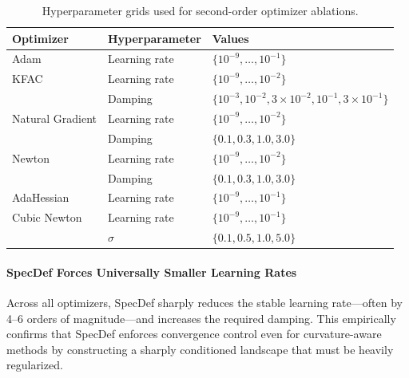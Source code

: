 \documentclass{article}
\theoremstyle{plain}
\theoremstyle{definition}
\theoremstyle{remark}
\begin{document}
\begin{table}[h]
\centering
\caption{Hyperparameter grids used for second-order optimizer ablations.}
\label{tab:second_order_optimizer_grids}
\begin{tabular}{lll}
\hline
\textbf{Optimizer} & \textbf{Hyperparameter} & \textbf{Values} \\
\hline
Adam & Learning rate &
$\{10^{-9}, \dots, 10^{-1}\}$ \\

KFAC & Learning rate &
$\{10^{-9}, \dots, 10^{-2}\}$ \\
     & Damping &
$\{10^{-3}, 10^{-2}, 3\!\times\!10^{-2}, 10^{-1}, 3\!\times\!10^{-1}\}$ \\

Natural Gradient & Learning rate &
$\{10^{-9}, \dots, 10^{-2}\}$ \\
                 & Damping &
$\{0.1, 0.3, 1.0, 3.0\}$ \\

Newton & Learning rate &
$\{10^{-9}, \dots, 10^{-2}\}$ \\
       & Damping &
$\{0.1, 0.3, 1.0, 3.0\}$ \\

AdaHessian & Learning rate &
$\{10^{-9}, \dots, 10^{-1}\}$ \\

Cubic Newton & Learning rate &
$\{10^{-9}, \dots, 10^{-1}\}$ \\
             & $\sigma$  &
$\{0.1, 0.5, 1.0, 5.0\}$ \\
\hline
\end{tabular}
\end{table}

\paragraph{SpecDef Forces Universally Smaller Learning Rates}
Across all optimizers, SpecDef sharply reduces the stable learning rate—often by 4–6 orders of magnitude—and increases the required damping. This empirically confirms that SpecDef enforces convergence control even for curvature-aware methods by constructing a sharply conditioned landscape that must be heavily regularized.
\end{document}
